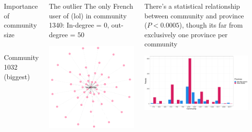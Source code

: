 \documentclass{beamer}\usepackage[]{graphicx}\usepackage[]{color}
\makeatletter
\def\maxwidth{ %
  \ifdim\Gin@nat@width>\linewidth
    \linewidth
  \else
    \Gin@nat@width
  \fi
}
\makeatother
\begin{document}
\begin{frame}
\begin{columns}[t]
\begin{block}{Importance of community size}
\begin{columns}
\begin{center}
                Community 1032 (biggest)
              \end{center}
          \end{columns}
        \end{block}

        \begin{columns}
            \begin{block}{The outlier}
              The only French user of (lol) in community 1340: \alert{In-degree = 0}, out-degree = 50
              \begin{center}
                \includegraphics[scale=0.95]{ego_fury.png}
              \end{center}
            \end{block}
            \begin{block}{}
              There's a statistical relationship between community and province ($P < 0.0005$), though its far from exclusively one province per community

\includegraphics[width=\maxwidth]{figure/unnamed-chunk-5-1} 


\end{block}
\end{columns}
\end{columns}
\end{frame}
\end{document}
